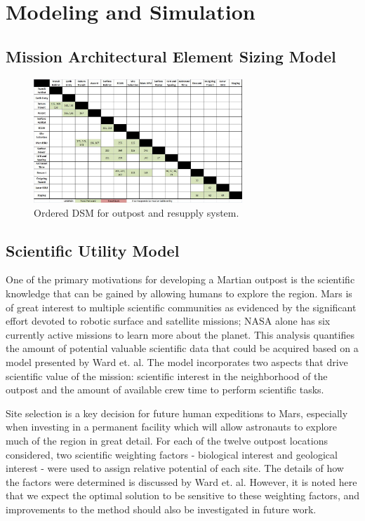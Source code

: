 \documentclass[]{aiaa-pretty}
\begin{document}
\section{Modeling and Simulation}
\label{sec:model}

\subsection{Mission Architectural Element Sizing Model}
\begin{figure}[h!]
	\centering
	\includegraphics[width=0.7\textwidth]{OrderedDSM}
	\caption{Ordered DSM for outpost and resupply system.}
	\label{fig:orderedDSM}
\end{figure}


\subsection{Scientific Utility Model}

One of the primary motivations for developing a Martian outpost is the scientific knowledge that can be gained by allowing humans to explore the region. Mars is of great interest to multiple scientific communities as evidenced by the significant effort devoted to robotic surface and satellite missions; NASA alone has six currently active missions to learn more about the planet. \cite{nasa2016mars} This analysis quantifies the amount of potential valuable scientific data that could be acquired based on a model presented by Ward et. al. \cite{ward2015} The model incorporates two aspects that drive scientific value of the mission: scientific interest in the neighborhood of the outpost and the amount of available crew time to perform scientific tasks.

Site selection is a key decision for future human expeditions to Mars, especially when investing in a permanent facility which will allow astronauts to explore much of the region in great detail. For each of the twelve outpost locations considered, two scientific weighting factors - biological interest and geological interest - were used to assign relative potential of each site. The details of how the factors were determined is discussed by Ward et. al. \cite{ward2015} However, it is noted here that we expect the optimal solution to be sensitive to these weighting factors, and improvements to the method should also be investigated in future work.
\end{document}
